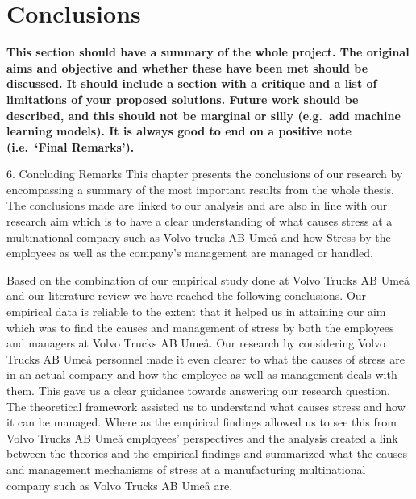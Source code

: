 \chapter{Conclusions}
\textbf{This section should have a summary of the whole project.  The original aims and objective and whether these have been met should be discussed. It should include a section with a critique and a list of limitations of your proposed solutions.  Future work should be described, and this should not be marginal or silly (e.g.\ add machine learning models).  It is always good to end on a positive note (i.e.\ `Final Remarks').}


 
6. Concluding Remarks 
This  chapter  presents  the  conclusions  of  our  research  by  encompassing  a  summary  of  the 
most important results from the whole thesis. The conclusions made are linked to our analysis 
and are also in line with our research aim which is to have a clear understanding of what 
causes stress at a multinational company such as Volvo trucks AB Umeå and how Stress by 
the employees as well as the company’s management are managed or handled.    
 
Based on the combination of our empirical study done at Volvo Trucks AB Umeå and our 
literature review we have reached the following conclusions. Our empirical data is reliable to 
the extent that it helped us in attaining our aim which was to find the causes and management 
of stress by both the employees and managers at Volvo Trucks AB Umeå. Our research by 
considering  Volvo Trucks  AB Umeå personnel  made it even  clearer to  what  the causes of 
stress  are  in  an  actual  company  and  how  the  employee  as  well  as  management  deals  with 
them. This gave us a clear guidance towards answering our research question. The theoretical 
framework assisted us to understand what causes stress and how it can be managed. Where as 
the  empirical  findings  allowed  us  to  see  this  from  Volvo  Trucks  AB  Umeå  employees’ 
perspectives and the analysis created a link between the theories and the empirical findings 
and summarized what the causes and management mechanisms of stress at a manufacturing 
multinational company such as Volvo Trucks AB Umeå are.   
 
